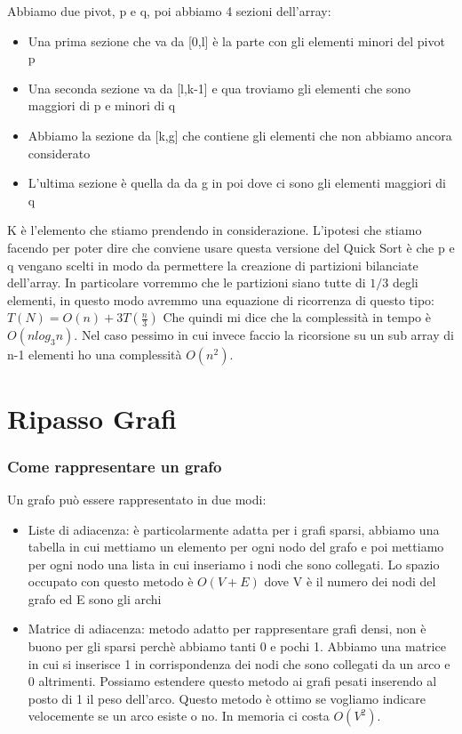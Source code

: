 \documentclass[14pt]{extreport}
\begin{document}
Abbiamo due pivot, p e q, poi abbiamo 4 sezioni dell'array:
\begin{itemize}
    \item Una prima sezione che va da [0,l] è la parte con gli elementi minori del pivot p
    \item Una seconda sezione va da [l,k-1] e qua troviamo gli elementi che sono maggiori di p e minori di q
    \item Abbiamo la sezione da [k,g] che contiene gli elementi che non abbiamo ancora considerato
    \item L'ultima sezione è quella da da g in poi dove ci sono gli elementi maggiori di q
\end{itemize}

K è l'elemento che stiamo prendendo in considerazione.
L'ipotesi che stiamo facendo per poter dire che conviene usare questa versione del Quick Sort è che p e q vengano scelti in modo da permettere la creazione di partizioni bilanciate dell'array. In particolare vorremmo che le partizioni siano tutte di $1/3$ degli elementi, in questo modo avremmo una equazione di ricorrenza di questo tipo:
$T(N) = O(n)+3T(\frac{n}{3})$ 
Che quindi mi dice che la complessità in tempo è $O(nlog_3 n)$.
Nel caso pessimo in cui invece faccio la ricorsione su un sub array di n-1 elementi ho una complessità $O(n^2)$.

\chapter{Ripasso Grafi}

\subsection{Come rappresentare un grafo}

Un grafo può essere rappresentato in due modi:
\begin{itemize}
\item Liste di adiacenza: è particolarmente adatta per i grafi sparsi, abbiamo una tabella in cui mettiamo un elemento per ogni nodo del grafo e poi mettiamo per ogni nodo una lista in cui inseriamo i nodi che sono collegati. Lo spazio occupato con questo metodo è $O(V+E)$ dove V è il numero dei nodi del grafo ed E sono gli archi
\item Matrice di adiacenza: metodo adatto per rappresentare grafi densi, non è buono per gli sparsi perchè abbiamo tanti 0 e pochi 1. Abbiamo una matrice in cui si inserisce 1 in corrispondenza dei nodi che sono collegati da un arco e 0 altrimenti. Possiamo estendere questo metodo ai grafi pesati inserendo al posto di 1 il peso dell'arco.
Questo metodo è ottimo se vogliamo indicare velocemente se un arco esiste o no. In memoria ci costa $O(V^2)$.
\end{itemize}
\end{document}
